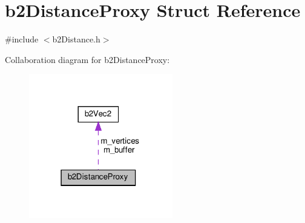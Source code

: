 \hypertarget{structb2DistanceProxy}{}\section{b2\+Distance\+Proxy Struct Reference}
\label{structb2DistanceProxy}


{\ttfamily \#include $<$b2\+Distance.\+h$>$}



Collaboration diagram for b2\+Distance\+Proxy\+:
\nopagebreak
\begin{figure}[H]
\begin{center}
\leavevmode
\includegraphics[width=178pt]{structb2DistanceProxy__coll__graph}
\end{center}
\end{figure}
